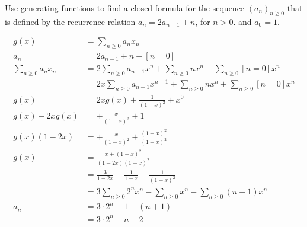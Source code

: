 Use generating functions to find a closed formula for the sequence $(a_n)_{n\ge0}$ that is defined by the recurrence relation $a_n = 2a_{n-1} + n$, for $n>0$. and $a_0=1$.
\begin{framed}
	\begin{align*}
		g(x) &= \sum_{n\ge0}a_nx_n\\
		a_n &= 2a_{n-1} + n + [n=0]\\
		\sum_{n\ge0}a_nx_n&= 2\sum_{n\ge0}a_{n-1}x^n + \sum_{n\ge0}nx^n + \sum_{n\ge0}[n=0]x^n\\
		&= 2x\sum_{n\ge0}a_{n-1}x^{n-1} + \sum_{n\ge0}nx^n + \sum_{n\ge0}[n=0]x^n\\
		g(x)&= 2xg(x) + \frac{1}{(1-x)^2} + x^0\\
		g(x)-2xg(x) &=  + \frac{x}{(1-x)^2} + 1\\
		g(x)(1-2x) &=  + \frac{x}{(1-x)^2}+\frac{(1-x)^2}{(1-x)^2}\\
		g(x) &=  \frac{x+(1-x)^2}{(1-2x)(1-x)^2}\\
			&= \frac{3}{1-2x}-\frac{1}{1-x} -\frac{1}{(1-x)^2}\\
			&= 3\sum_{n\ge0}2^nx^n - \sum_{n\ge0}x^n - \sum_{n\ge0}(n+1)x^n\\
		a_n &= 3\cdot2^n - 1 - (n+1)\\
			&=  3\cdot2^n - n - 2
	\end{align*}
\end{framed}